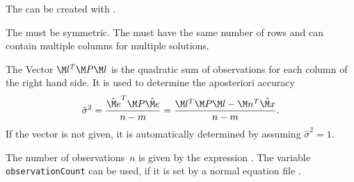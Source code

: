 The  can be created with .

The  must be symmetric.
The  must have the same number of rows
and can contain multiple columns for multiple solutions.

The Vector $\M l^T\M P\M l$ is the quadratic sum of observations for each column of the right hand side.
It is used to determine the aposteriori accuracy
\begin{equation}
\hat{\sigma}^2 = \frac{\hat{\M e}^T\M P\hat{\M e}}{n-m} = \frac{\M l^T\M P\M l - \M n^T\hat{\M x}}{n-m}.
\end{equation}
If the vector is not given, it is automatically determined by assuming $\hat{\sigma}^2=1$.

The number of observations~$n$ is given by the expression .
The variable \verb|observationCount| can be used, if it is set by a normal equation file
.


